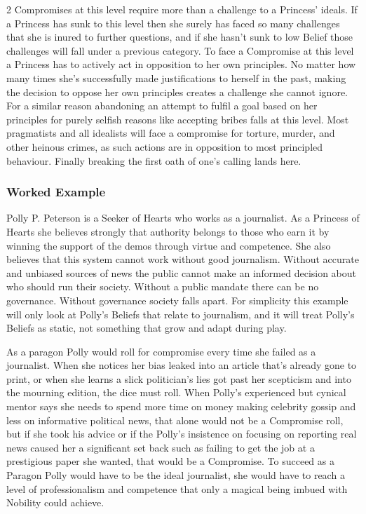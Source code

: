 \begin{multicols}{2}
Compromises at this level require more than a challenge to a Princess' ideals. If a Princess has sunk to this level then she surely has faced so many challenges that she is inured to further questions, and if she hasn't sunk to low Belief those challenges will fall under a previous category. To face a Compromise at this level a Princess has to actively act in opposition to her own principles. No matter how many times she's successfully made justifications to herself in the past, making the decision to oppose her own principles creates a challenge she cannot ignore. For a similar reason abandoning an attempt to fulfil a goal based on her principles for purely selfish reasons like accepting bribes falls at this level. Most pragmatists and all idealists will face a compromise for torture, murder, and other heinous crimes, as such actions are in opposition to most principled behaviour. Finally breaking the first oath of one's calling lands here. 

\subsubsection*{Worked Example}

Polly P. Peterson is a Seeker of Hearts who works as a journalist. As a Princess of Hearts she believes strongly that authority belongs to those who earn it by winning the support of the demos through virtue and competence. She also believes that this system cannot work without good journalism. Without accurate and unbiased sources of news the public cannot make an informed decision about who should run their society. Without a public mandate there can be no governance. Without governance society falls apart. For simplicity this example will only look at Polly's Beliefs that relate to journalism, and it will treat Polly's Beliefs as static, not something that grow and adapt during play. 

As a paragon Polly would roll for compromise every time she failed as a journalist. When she notices her bias leaked into an article that's already gone to print, or when she learns a slick politician's lies got past her scepticism and into the mourning edition, the dice must roll. When Polly's experienced but cynical mentor says she needs to spend more time on money making celebrity gossip and less on informative political news, that alone would not be a Compromise roll, but if she took his advice or if the Polly's insistence on focusing on reporting real news caused her a significant set back such as failing to get the job at a prestigious paper she wanted, that would be a Compromise. To succeed as a Paragon Polly would have to be the ideal journalist, she would have to reach a level of professionalism and competence that only a magical being imbued with Nobility could achieve. 


\end{multicols}
